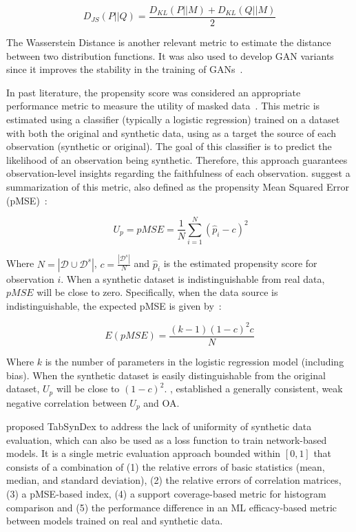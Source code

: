 \begin{equation}
    D_{JS}(P||Q) = \frac{D_{KL}(P||M) + D_{KL}(Q||M)}{2}
\end{equation}

The Wasserstein Distance is another relevant metric to estimate the
distance between two distribution functions. It was also used to develop GAN
variants since it improves the stability in the training of
GANs~\cite{gulrajani2017improved, goncalves2020generation}.

In past literature, the propensity score was considered an appropriate
performance metric to measure the utility of masked data~\cite{woo2009global}.
This metric is estimated using a classifier (typically a logistic regression)
trained on a dataset with both the original and synthetic data, using as a
target the source of each observation (synthetic or original). The goal of
this classifier is to predict the likelihood of an observation being
synthetic. Therefore, this approach guarantees observation-level insights
regarding the faithfulness of each observation. \cite{woo2009global} suggest
a summarization of this metric, also defined as the propensity Mean Squared Error
(pMSE)~\cite{chundawat2022tabsyndex}:

\begin{equation}~\label{ep:propensity}
    U_p = pMSE = \frac{1}{N} \sum^N_{i=1}{(\hat{p}_i - c)}^2
\end{equation}

Where $N = |\mathcal{D} \cup \mathcal{D}^s|$, $c = \frac{|\mathcal{D}^s|}{N}$
and $\hat{p}_i$ is the estimated propensity score for observation $i$. When a
synthetic dataset is indistinguishable from real data, $pMSE$ will be close to
zero. Specifically, when the data source is indistinguishable, the expected
pMSE is given by~\cite{snoke2018general}:

\begin{equation}
    E(pMSE) = \frac{(k-1)(1-c)^2c}{N}
\end{equation}

Where $k$ is the number of parameters in the logistic regression model
(including bias). When the synthetic dataset is easily distinguishable from
the original dataset, $U_p$ will be close to ${(1-c)}^2$.
\cite{dankar2021fake}, established a generally consistent, weak negative
correlation between $U_p$ and OA\@.

\cite{chundawat2022tabsyndex} proposed TabSynDex to address the lack of
uniformity of synthetic data evaluation, which can also be used as a loss
function to train network-based models. It is a single metric evaluation
approach bounded within $[0,1]$ that consists of a combination of (1) the
relative errors of basic statistics (mean, median, and standard deviation), (2)
the relative errors of correlation matrices, (3) a pMSE-based index, (4) a
support coverage-based metric for histogram comparison and (5) the performance
difference in an ML efficacy-based metric between models trained on real and
synthetic data.

